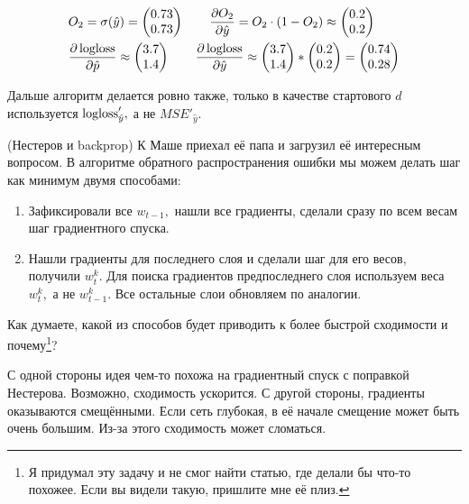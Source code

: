 \begin{sol}
\begin{equation*}
    \begin{aligned} 
    & O_2 = \sigma(\hat y) = \begin{pmatrix} 0.73 \\ 0.73 \end{pmatrix} \qquad  \frac{\partial O_2}{\partial \hat y} = O_2 \cdot (1 - O_2) \approx \begin{pmatrix} 0.2 \\ 0.2 \end{pmatrix} \\ 
    & \frac{\partial \operatorname{logloss}}{\partial \hat p} \approx \begin{pmatrix} 3.7 \\ 1.4 \end{pmatrix} \qquad \frac{\partial \operatorname{logloss}}{\partial \hat y} \approx \begin{pmatrix} 3.7 \\ 1.4 \end{pmatrix} * \begin{pmatrix} 0.2 \\ 0.2 \end{pmatrix} = \begin{pmatrix} 0.74 \\ 0.28 \end{pmatrix}
    \end{aligned}
\end{equation*}

Дальше алгоритм делается ровно также, только в качестве стартового $d$ используется $\operatorname{logloss}'_{\hat y},$ а не $MSE'_{\hat y}.$
\end{sol} 


\begin{problem}{(Нестеров и backprop)}
    К Маше приехал её папа и загрузил её интересным вопросом. В алгоритме обратного распространения ошибки мы можем делать шаг как минимум двумя способами: 
    
    \begin{enumerate} 
        \item Зафиксировали все $w_{t-1},$ нашли все градиенты, сделали сразу по всем весам шаг градиентного спуска.
        
        \item Нашли градиенты для последнего слоя и сделали шаг для его весов, получили $w_t^k.$ Для поиска градиентов предпоследнего слоя используем веса  $w_t^k,$ а не $w_{t-1}^k.$ Все остальные слои обновляем по аналогии. 
    \end{enumerate} 
    
    Как думаете, какой из способов будет приводить к более быстрой сходимости и почему\footnote{Я придумал эту задачу и не смог найти статью, где делали бы что-то похожее. Если вы видели такую, пришлите мне её плиз.}? 
\end{problem} 

\begin{sol}
С одной стороны идея чем-то похожа на градиентный спуск с поправкой Нестерова. Возможно, сходимость ускорится. С другой стороны, градиенты оказываются смещёнными. Если сеть глубокая, в её начале смещение может быть очень большим. Из-за этого сходимость может сломаться. 
\end{sol} 


